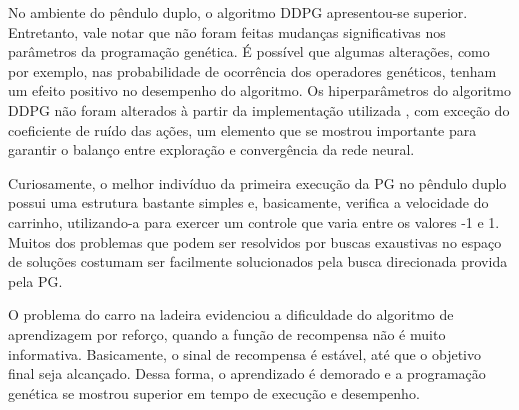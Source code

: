 No ambiente do pêndulo duplo, o algoritmo DDPG apresentou-se superior. Entretanto, vale notar que não foram feitas mudanças significativas nos parâmetros da programação genética. É possível que algumas alterações, como por exemplo, nas probabilidade de ocorrência dos operadores genéticos, tenham um efeito positivo no desempenho do algoritmo. Os hiperparâmetros do algoritmo DDPG não foram alterados à partir da implementação utilizada \cite{stable-baselines}, com exceção do coeficiente de ruído das ações, um elemento que se mostrou importante para garantir o balanço entre exploração e convergência da rede neural.

Curiosamente, o melhor indivíduo da primeira execução da PG no pêndulo duplo possui uma estrutura bastante simples e, basicamente, verifica a velocidade do carrinho, utilizando-a para exercer um controle que varia entre os valores -1 e 1. Muitos dos problemas que podem ser resolvidos por buscas exaustivas no espaço de soluções costumam ser facilmente solucionados pela busca direcionada provida pela PG. 

O problema do carro na ladeira evidenciou a dificuldade do algoritmo de aprendizagem por reforço, quando a função de recompensa não é muito informativa. Basicamente, o sinal de recompensa é estável, até que o objetivo final seja alcançado. Dessa forma, o aprendizado é demorado e a programação genética se mostrou superior em tempo de execução e desempenho.




